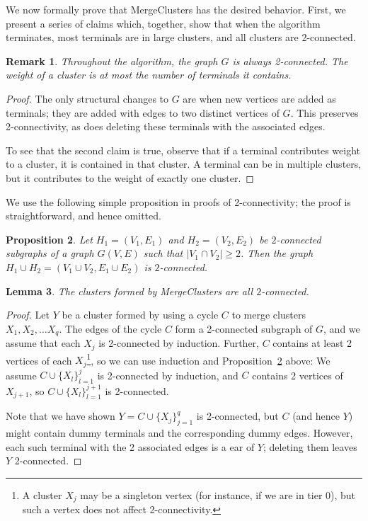 \documentclass[11pt]{article}
\newtheorem{lemma}{Lemma}[section]
\newtheorem{proposition}[lemma]{Proposition}
\newtheorem{remark}[lemma]{Remark}
\begin{document}
We now formally prove that {\sc MergeClusters} has the desired
behavior. First, we present a series of claims which, together, show
that when the algorithm terminates, most terminals are in large
clusters, and all clusters are 2-connected.

\begin{remark}\label{rem:cluster}
  Throughout the algorithm, the graph $G$ is always 2-connected. The
  weight of a cluster is at most the number of terminals it contains.
\end{remark}
\begin{proof}
  The only structural changes to $G$ are when new vertices are added
  as terminals; they are added with edges to two distinct vertices of
  $G$. This preserves 2-connectivity, as does deleting these terminals
  with the associated edges.

  To see that the second claim is true, observe that if a terminal
  contributes weight to a cluster, it is contained in that cluster. A
  terminal can be in multiple clusters, but it contributes to the
  weight of exactly one cluster.
\end{proof}

We use the following simple proposition in proofs of 2-connectivity;
the proof is straightforward, and hence omitted.

\begin{proposition}\label{prop:shareEdge}
  Let $H_1=(V_1,E_1)$ and $H_2=(V_2, E_2)$ be $2$-connected subgraphs
  of a graph $G(V,E)$ such that $|V_1 \cap V_2| \ge 2$.  Then the
  graph $H_1 \cup H_2 = (V_1 \cup V_2, E_1 \cup E_2)$ is
  $2$-connected.
\end{proposition}

\begin{lemma}\label{lem:clusters2conn}
The clusters formed by {\sc MergeClusters} are all $2$-connected.
\end{lemma}
\begin{proof}
  Let $Y$ be a cluster formed by using a cycle $C$ to merge clusters
  $X_1, X_2, \ldots X_q$. The edges of the cycle $C$ form a
  2-connected subgraph of $G$, and we assume that each $X_j$ is
  2-connected by induction.  Further, $C$ contains at least 2 vertices
  of each $X_j$\footnote{A cluster $X_j$ may be a singleton vertex
    (for instance, if we are in tier 0), but such a vertex does not
    affect 2-connectivity.}, so we can use induction and
  Proposition~\ref{prop:shareEdge} above: We assume $C
  \cup\{X_l\}_{l=1}^j$ is 2-connected by induction, and $C$ contains 2
  vertices of $X_{j+1}$, so $C \cup\{X_l\}_{l=1}^{j+1}$ is
  2-connected.

  Note that we have shown $Y = C \cup \{X_j\}_{j=1}^q$ is 2-connected,
  but $C$ (and hence $Y$) might contain dummy terminals and the
  corresponding dummy edges. However, each such terminal with the 2
  associated edges is a ear of $Y$; deleting them leaves $Y$
  2-connected.
\end{proof}
\end{document}
